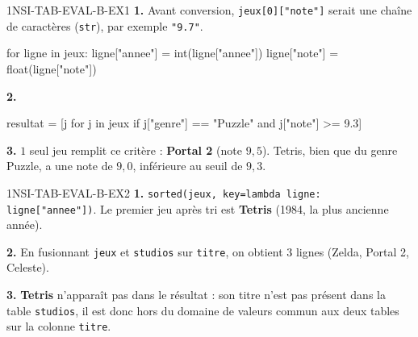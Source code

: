 \begin{corrige}{1NSI-TAB-EVAL-B-EX1}
\textbf{1.} Avant conversion, \lstinline{jeux[0]["note"]} serait une chaîne de caractères
(\lstinline{str}), par exemple \lstinline{"9.7"}.
\begin{python}
for ligne in jeux:
    ligne["annee"] = int(ligne["annee"])
    ligne["note"] = float(ligne["note"])
\end{python}

\textbf{2.}
\begin{python}
resultat = [j for j in jeux if j["genre"] == "Puzzle" and j["note"] >= 9.3]
\end{python}

\textbf{3.} $1$ seul jeu remplit ce critère : \textbf{Portal 2} (note $9{,}5$). Tetris, bien
que du genre Puzzle, a une note de $9{,}0$, inférieure au seuil de $9{,}3$.
\end{corrige}

\begin{corrige}{1NSI-TAB-EVAL-B-EX2}
\textbf{1.} \lstinline{sorted(jeux, key=lambda ligne: ligne["annee"])}. Le premier jeu
après tri est \textbf{Tetris} (1984, la plus ancienne année).

\textbf{2.} En fusionnant \lstinline{jeux} et \lstinline{studios} sur \lstinline{titre}, on
obtient $3$ lignes (Zelda, Portal 2, Celeste).

\textbf{3.} \textbf{Tetris} n'apparaît pas dans le résultat : son titre n'est pas présent
dans la table \lstinline{studios}, il est donc hors du domaine de valeurs commun aux deux
tables sur la colonne \lstinline{titre}.
\end{corrige}
